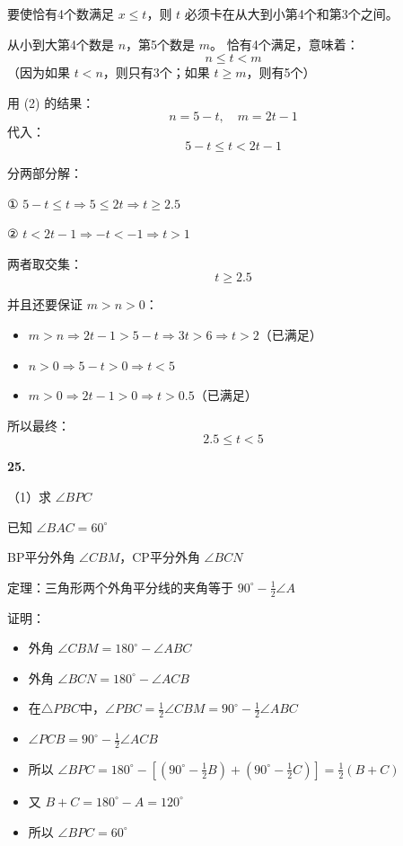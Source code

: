 要使恰有4个数满足 \(x \leq t\)，则 \(t\) 必须卡在从大到小第4个和第3个之间。

从小到大第4个数是 \(n\)，第5个数是 \(m\)。
恰有4个满足，意味着：
\[
n \leq t < m
\]
（因为如果 \(t < n\)，则只有3个；如果 \(t \geq m\)，则有5个）

用 (2) 的结果：
\[
n = 5 - t,\quad m = 2t - 1
\]
代入：
\[
5 - t \leq t < 2t - 1
\]

分两部分解：

① \(5 - t \leq t \Rightarrow 5 \leq 2t \Rightarrow t \geq 2.5\)

② \(t < 2t - 1 \Rightarrow -t < -1 \Rightarrow t > 1\)

两者取交集：
\[
t \geq 2.5
\]

并且还要保证 \(m > n > 0\)：
\begin{itemize}
\item \(m > n \Rightarrow 2t-1 > 5-t \Rightarrow 3t > 6 \Rightarrow t > 2\)（已满足）
\item \(n > 0 \Rightarrow 5-t > 0 \Rightarrow t < 5\)
\item \(m > 0 \Rightarrow 2t-1 > 0 \Rightarrow t > 0.5\)（已满足）
\end{itemize}

所以最终：
\[
\boxed{2.5 \leq t < 5}
\]

\bigskip

\textbf{25.}

（1）求 \(\angle BPC\)

已知 \(\angle BAC = 60^\circ\)

BP平分外角 \(\angle CBM\)，CP平分外角 \(\angle BCN\)

定理：三角形两个外角平分线的夹角等于 \(90^\circ - \frac12 \angle A\)

证明：
\begin{itemize}
\item 外角 \(\angle CBM = 180^\circ - \angle ABC\)
\item 外角 \(\angle BCN = 180^\circ - \angle ACB\)
\item 在\(\triangle PBC\)中，\(\angle PBC = \frac12 \angle CBM = 90^\circ - \frac12 \angle ABC\)
\item \(\angle PCB = 90^\circ - \frac12 \angle ACB\)
\item 所以 \(\angle BPC = 180^\circ - \left[ \left(90^\circ - \frac12 B\right) + \left(90^\circ - \frac12 C\right) \right] = \frac12 (B+C)\)
\item 又 \(B+C = 180^\circ - A = 120^\circ\)
\item 所以 \(\angle BPC = 60^\circ\)
\end{itemize}

